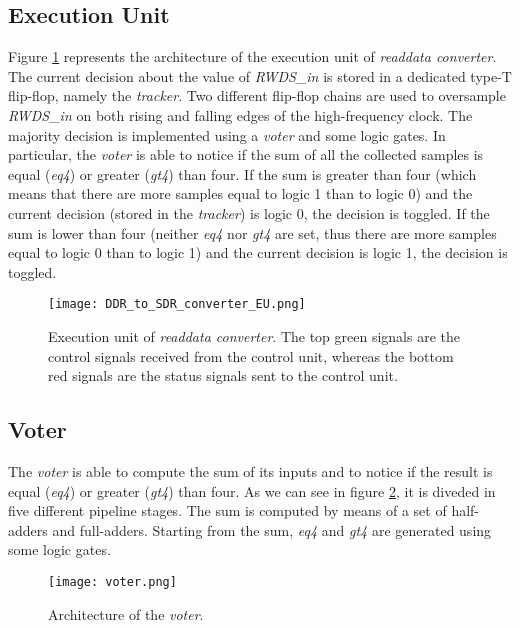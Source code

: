 \documentclass[10pt, english, a4paper, titlepage, oneside]{book}
\begin{document}
\subsection{Execution Unit} \label{readdataconv_EU}
\vspace{2mm}
\noindent Figure \ref{DDR_to_SDR_converter_EU} represents the architecture of the execution unit of \textit{readdata converter}. The current decision about the value of \textit{RWDS\_in} is stored in a dedicated type-T flip-flop, namely the \textit{tracker}. Two different flip-flop chains are used to oversample \textit{RWDS\_in} on both rising and falling edges of the high-frequency clock. The majority decision is implemented using a \textit{voter} and some logic gates. In particular, the \textit{voter} is able to notice if the sum of all the collected samples is equal (\textit{eq4}) or greater (\textit{gt4}) than four. If the sum is greater than four (which means that there are more samples equal to logic 1 than to logic 0) and the current decision (stored in the \textit{tracker}) is logic 0, the decision is toggled. If the sum is lower than four (neither \textit{eq4} nor \textit{gt4} are set, thus there are more samples equal to logic 0 than to logic 1) and the current decision is logic 1, the decision is toggled.
\vspace{2mm}
\begin{figure}[H]
    \centering
    \captionsetup{width=16cm}
    \texttt{[image: DDR\_to\_SDR\_converter\_EU.png]}
    \caption{\centering Execution unit of \textit{readdata converter}. The top green signals are the control signals received from the control unit, whereas the bottom red signals are the status signals sent to the control unit.}
    \label{DDR_to_SDR_converter_EU}
\end{figure}
\vspace{4mm}
\subsection{Voter}
\vspace{2mm}
The \textit{voter} is able to compute the sum of its inputs and to notice if the result is equal (\textit{eq4}) or greater (\textit{gt4}) than four. As we can see in figure \ref{voter}, it is diveded in five different pipeline stages. The sum is computed by means of a set of half-adders and full-adders. Starting from the sum, \textit{eq4} and \textit{gt4} are generated using some logic gates.
\vspace{6mm}
\begin{figure}[H]
    \centering
    \captionsetup{width=10cm}
    \texttt{[image: voter.png]}
    \vspace{4mm}
    \caption{\centering Architecture of the \textit{voter}.}
    \label{voter}
\end{figure}
\vspace{2mm}
\end{document}
